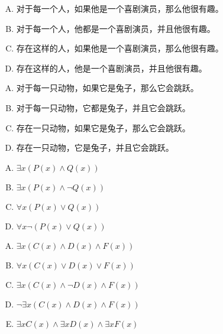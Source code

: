 {{        %
        \begin{practices}
            \begin{enumerate}[A.]
                \item 对于每一个人，如果他是一个喜剧演员，那么他很有趣。
                \item 对于每一个人，他都是一个喜剧演员，并且他很有趣。
                \item 存在这样的人，如果他是一个喜剧演员，那么他很有趣。
                \item 存在这样的人，他是一个喜剧演员，并且他很有趣。
            \end{enumerate}
        \end{practices}

        \begin{practices}
            \begin{enumerate}[A.]
                \item 对于每一只动物，如果它是兔子，那么它会跳跃。
                \item 对于每一只动物，它都是兔子，并且它会跳跃。
                \item 存在一只动物，如果它是兔子，那么它会跳跃。
                \item 存在一只动物，它是兔子，并且它会跳跃。
            \end{enumerate}
        \end{practices}

        \begin{practices}
            \begin{enumerate}[A.]
                \item $\exists x (P(x) \wedge Q(x))$
                \item $\exists x (P(x) \wedge \neg Q(x))$
                \item $\forall x (P(x) \vee Q(x))$
                \item $\forall x \neg (P(x) \vee Q(x))$
            \end{enumerate}
        \end{practices}

        \begin{practices}
            \begin{enumerate}[A.]
                \item $\exists x (C(x) \wedge D(x) \wedge F(x))$
                \item $\forall x (C(x) \vee D(x) \vee F(x))$
                \item $\exists x (C(x) \wedge \neg D(x) \wedge F(x))$
                \item $\neg \exists x (C(x) \wedge D(x) \wedge F(x))$
                \item $\exists x C(x) \wedge \exists x D(x) \wedge \exists x F(x)$
            \end{enumerate}
        \end{practices}

}}
